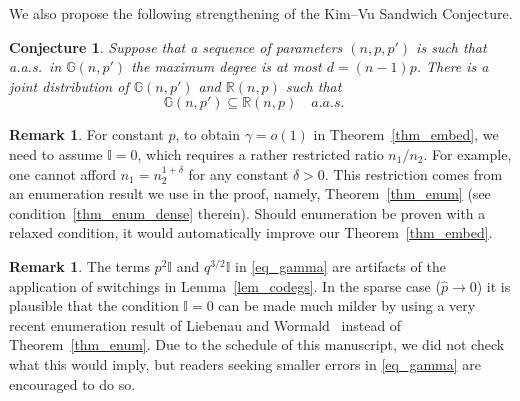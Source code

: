 \documentclass[12pt,reqno]{amsart}
\newcommand{\R} {\mathbb R}
\newcommand{\G} {\mathbb G}
\newcommand{\I} {\mathbb I}
\newtheorem{conjecture}{Conjecture}
\theoremstyle{definition}
\newtheorem{remark}[theorem]{Remark}
\begin{document}
We also propose the following strengthening of the Kim--Vu Sandwich Conjecture.
\begin{conjecture}
  Suppose that a sequence of parameters $(n, p, p')$ is such that a.a.s.\ in $\G(n, p')$ the maximum degree is at most $d = (n-1)p$. There is a joint distribution of $\G(n, p')$ and $\R(n,p)$ such that
	\begin{equation*}
	  \G(n, p') \subseteq \R(n,p) \quad a.a.s. \quad
	\end{equation*}
\end{conjecture}

\begin{remark}
  \label{rem_large_p}
  For constant $p$, to obtain $\gamma = o(1)$ in Theorem~\ref{thm_embed}, we need to assume $\I = 0$, which requires a rather restricted ratio $n_1/n_2$. For example, one cannot afford $n_1 = n_2^{1+\delta}$ for any constant $\delta > 0$. This restriction comes from an enumeration result we use in the proof, namely, Theorem~\ref{thm_enum} (see condition~\ref{thm_enum_dense} therein). Should enumeration be proven with a relaxed condition, it would automatically improve our Theorem~\ref{thm_embed}.
\end{remark}
\begin{remark}
  \label{rem_Ip}
  The terms $ p^2\I$ and $q^{3/2}\I$ in \eqref{eq_gamma} are artifacts of the application of switchings in Lemma~\ref{lem_codegs}. In the sparse case ($\hat p \to 0$) it is plausible that the condition $\I = 0$ can be made much milder by using a very recent enumeration result of Liebenau and Wormald~\cite{LW2020} instead of Theorem~\ref{thm_enum}. Due to the schedule of this manuscript, we did not check what this would imply, but readers seeking smaller errors in \eqref{eq_gamma} are encouraged to do so.
\end{remark}
\end{document}
